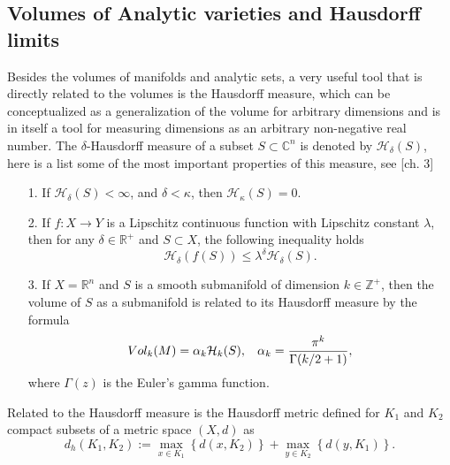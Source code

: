 \documentclass[letterpaper]{book}
\newcommand{\zah}{\ensuremath{ \mathbb Z }}
\newcommand{\con}{\ensuremath{\mathbb{C}^n}}
\newcommand{\re}{\ensuremath{\mathbb R }}
\begin{document}
\subsection{Volumes of Analytic varieties and Hausdorff limits}
\noindent Besides the volumes of manifolds and analytic sets, a very useful tool that is directly related to the volumes is the Hausdorff measure, which can be conceptualized as a generalization of the volume for arbitrary dimensions and is in itself a tool for measuring dimensions as an arbitrary non-negative real number.
The $\delta$-Hausdorff measure of a subset $S\subset\con$ is denoted by $\mathcal{H}_{\delta}(S)$, here is a list some of the most important properties of this measure, see \cite{Stolzenberg}[ch. 3]

\begin{enumerate}
        \item[1.] If $\mathcal{H}_{\delta}(S)<\infty$, and $\delta<\kappa$, then $\mathcal{H}_{\kappa}(S)=0$.\\

        \item[2.] If $f:X\rightarrow Y$ is a Lipschitz continuous function with
        Lipschitz constant $\lambda$, then for any $\delta\in\re^{+}$ and
        $S\subset X$, the following inequality holds
        \[
        \mathcal{H}_{\delta}(f(S))\leq\lambda^{\delta}\mathcal{H}_{\delta}(S).
        \]
        \item[3.]If $X=\re^{n}$ and $S$ is a smooth submanifold of dimension
        $k\in\zah^{+}$, then the volume of $S$ as a submanifold is related to
        its Hausdorff measure by the formula
        \[
        Vol_{k}(M)=\alpha_{k}\mathcal{H}_k(S),\hspace*{0.3cm}\alpha_k= \frac{\pi^k}{\Gamma(k/2+1)},
        \]
\noindent where $\Gamma(z)$ is the Euler's gamma function.
\end{enumerate}

Related to the Hausdorff measure is the Hausdorff metric defined for $K_1$
and $K_2$ compact subsets of a metric space $(X,d)$ as $$
d_h(K_1,K_2):= \max_{x\in K_1}\left\{d(x,K_2)\right\}+\max_{y\in K_2}\left\{d(y,K_1)\right\}.$$
\end{document}
